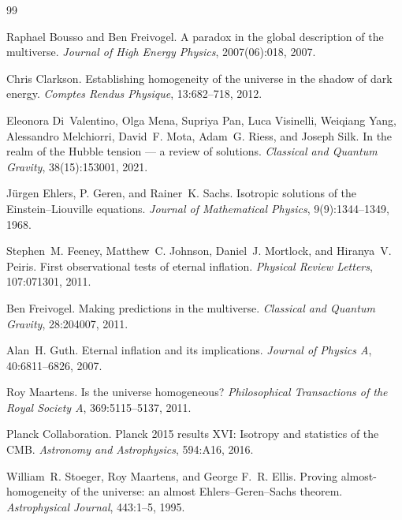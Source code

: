 \documentclass[11pt,a4paper]{article}
\theoremstyle{remark}\newtheorem{remark}[definition]{Remark}
\begin{document}
\begin{thebibliography}{99}

Raphael Bousso and Ben Freivogel.
\newblock A paradox in the global description of the multiverse.
\newblock \emph{Journal of High Energy Physics}, 2007(06):018, 2007.

Chris Clarkson.
\newblock Establishing homogeneity of the universe in the shadow of dark energy.
\newblock \emph{Comptes Rendus Physique}, 13:682--718, 2012.

Eleonora Di~Valentino, Olga Mena, Supriya Pan, Luca Visinelli, Weiqiang Yang,
  Alessandro Melchiorri, David~F. Mota, Adam~G. Riess, and Joseph Silk.
\newblock In the realm of the Hubble tension --- a review of solutions.
\newblock \emph{Classical and Quantum Gravity}, 38(15):153001, 2021.

J\"{u}rgen Ehlers, P. Geren, and Rainer~K. Sachs.
\newblock Isotropic solutions of the Einstein--Liouville equations.
\newblock \emph{Journal of Mathematical Physics}, 9(9):1344--1349, 1968.

Stephen~M. Feeney, Matthew~C. Johnson, Daniel~J. Mortlock, and Hiranya~V. Peiris.
\newblock First observational tests of eternal inflation.
\newblock \emph{Physical Review Letters}, 107:071301, 2011.

Ben Freivogel.
\newblock Making predictions in the multiverse.
\newblock \emph{Classical and Quantum Gravity}, 28:204007, 2011.

Alan~H. Guth.
\newblock Eternal inflation and its implications.
\newblock \emph{Journal of Physics A}, 40:6811--6826, 2007.

Roy Maartens.
\newblock Is the universe homogeneous?
\newblock \emph{Philosophical Transactions of the Royal Society A}, 369:5115--5137, 2011.

Planck Collaboration.
\newblock Planck 2015 results XVI: Isotropy and statistics of the CMB.
\newblock \emph{Astronomy and Astrophysics}, 594:A16, 2016.

William~R. Stoeger, Roy Maartens, and George F.~R. Ellis.
\newblock Proving almost-homogeneity of the universe: an almost Ehlers--Geren--Sachs theorem.
\newblock \emph{Astrophysical Journal}, 443:1--5, 1995.

\end{thebibliography}
\end{document}
